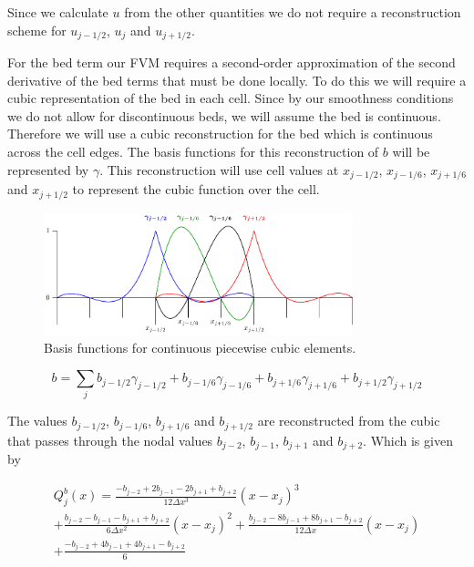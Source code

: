 Since we calculate $u$ from the other quantities we do not require a reconstruction scheme for $u_{j-1/2}$, $u_j$ and $u_{j+1/2}$.



For the bed term our FVM requires a second-order approximation of the second derivative of the bed terms that must be done locally. To do this we will require a cubic representation of the bed in each cell. Since by our smoothness conditions we do not allow for discontinuous beds, we will assume the bed is continuous. Therefore we will use a cubic reconstruction for the bed which is continuous across the cell edges. The basis functions for this reconstruction of $b$ will be represented by $\gamma$. This reconstruction will use cell values at $x_{j-1/2}$, $x_{j-1/6}$, $x_{j+1/6}$ and $x_{j + 1/2}$ to represent the cubic function over the cell. 


\begin{figure}
	\centering
	\includegraphics[width=0.8\textwidth]{./chp3/figures/P3.pdf}
	\caption{Basis functions for continuous piecewise cubic elements.}
	\label{fig:P3ContBasis}
\end{figure}

\begin{equation}
b = \sum_j b_{j-1/2}\gamma_{j-1/2} + b_{j-1/6}\gamma_{j-1/6}  + b_{j+1/6}\gamma_{j+1/6} + b_{j+1/2}\gamma_{j+1/2}
\end{equation}

The values $b_{j-1/2}$, $b_{j-1/6}$, $b_{j+1/6}$  and $b_{j+1/2}$ are reconstructed from the cubic that passes through the nodal values $b_{j-2}$, $b_{j-1}$, $b_{j+1}$  and $b_{j+2}$. Which is given by

\begin{multline}
Q^b_j(x)= \frac{-b_{j-2} +2 b_{j-1} - 2 b_{j+1} + b_{j+2}}{12\Delta x^3} \left(x - x_j\right)^3 \\ +  \frac{b_{j-2} - b_{j-1} - b_{j+1} + b_{j+2}}{6\Delta x^2} \left(x - x_j\right)^2 +  \frac{b_{j-2} - 8b_{j-1} +8 b_{j+1} - b_{j+2}}{12\Delta x} \left(x - x_j\right) \\ + \frac{-b_{j-2} + 4b_{j-1} + 4 b_{j+1} - b_{j+2}}{6}
\end{multline}

